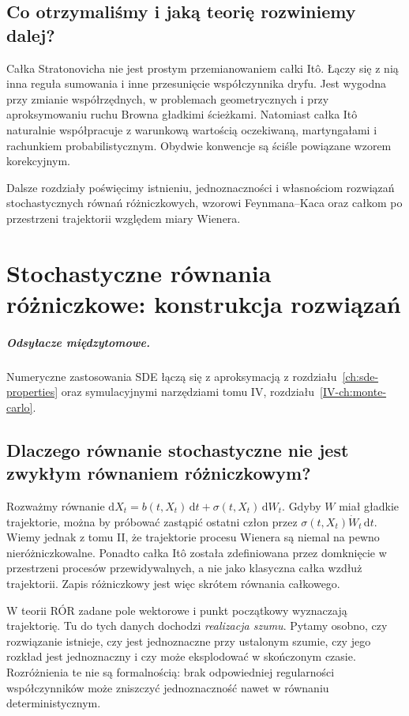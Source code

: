 \documentclass[11pt,a4paper,oneside]{report}
\numberwithin{equation}{chapter}
\theoremstyle{plain}
\theoremstyle{definition}
\theoremstyle{remark}
\newcommand{\dd}{\mathrm{d}}
\begin{document}
\section{Co otrzymaliśmy i jaką teorię rozwiniemy dalej?}
Całka Stratonovicha nie jest prostym przemianowaniem
całki Itô. Łączy się z nią inna reguła sumowania i
inne przesunięcie współczynnika dryfu. Jest wygodna
przy zmianie współrzędnych, w problemach geometrycznych
i przy aproksymowaniu ruchu Browna gładkimi ścieżkami.
Natomiast całka Itô naturalnie współpracuje z
warunkową wartością oczekiwaną, martyngałami i
rachunkiem probabilistycznym. Obydwie konwencje są
ściśle powiązane wzorem korekcyjnym.

Dalsze rozdziały poświęcimy istnieniu, jednoznaczności
i własnościom rozwiązań stochastycznych równań
różniczkowych, wzorowi Feynmana--Kaca oraz całkom
po przestrzeni trajektorii względem miary Wienera.


\chapter{Stochastyczne równania różniczkowe: konstrukcja rozwiązań}
\label{ch:sde-existence}
\paragraph{Odsyłacze międzytomowe.} Numeryczne zastosowania SDE łączą się z aproksymacją z rozdziału~\ref{ch:sde-properties} oraz symulacyjnymi narzędziami tomu IV, rozdziału~\ref{IV-ch:monte-carlo}.


\section{Dlaczego równanie stochastyczne nie jest zwykłym równaniem różniczkowym?}
Rozważmy równanie $\dd X_t=b(t,X_t)\,\dd t+\sigma(t,X_t)\,\dd W_t$.
Gdyby $W$ miał gładkie trajektorie, można by próbować zastąpić
ostatni człon przez $\sigma(t,X_t)\dot W_t\,\dd t$.
Wiemy jednak z tomu II, że trajektorie procesu Wienera
są niemal na pewno nieróżniczkowalne. Ponadto całka Itô
została zdefiniowana przez domknięcie w przestrzeni procesów
przewidywalnych, a nie jako klasyczna całka wzdłuż trajektorii.
Zapis różniczkowy jest więc skrótem równania całkowego.

W teorii RÓR zadane pole wektorowe i punkt początkowy wyznaczają
trajektorię. Tu do tych danych dochodzi \emph{realizacja szumu}.
Pytamy osobno, czy rozwiązanie istnieje, czy jest jednoznaczne
przy ustalonym szumie, czy jego rozkład jest jednoznaczny i czy
może eksplodować w skończonym czasie. Rozróżnienia te nie są
formalnością: brak odpowiedniej regularności współczynników
może zniszczyć jednoznaczność nawet w równaniu deterministycznym.
\end{document}
